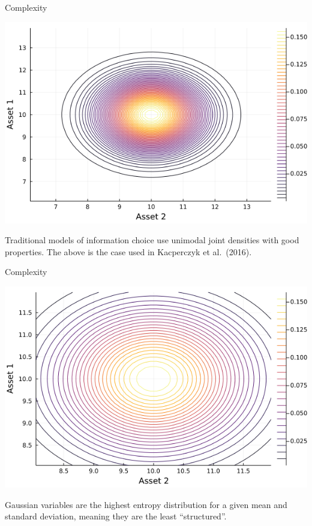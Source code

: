 \documentclass[
  ignorenonframetext,
]{beamer}
\begin{document}
\begin{frame}{Complexity}
\protect\hypertarget{complexity-1}{}
\begin{center}\includegraphics[width=0.9\paperheight]{complexity_files/figure-beamer/unnamed-chunk-2-1} \end{center}

Traditional models of information choice use unimodal joint densities
with good properties. The above is the case used in Kacperczyk et
al.~(2016).
\end{frame}

\begin{frame}{Complexity}
\protect\hypertarget{complexity-2}{}
\begin{center}\includegraphics[width=0.9\paperheight]{complexity_files/figure-beamer/unnamed-chunk-3-1} \end{center}

Gaussian variables are the highest entropy distribution for a given mean
and standard deviation, meaning they are the least ``structured''.
\end{frame}
\end{document}
